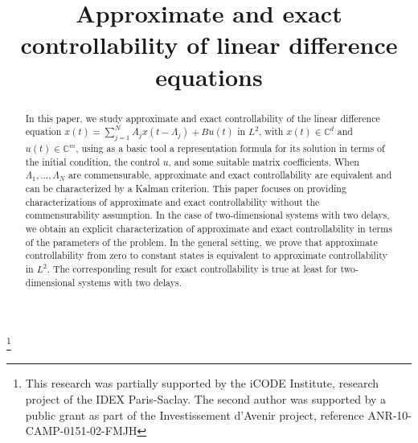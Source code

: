 \documentclass[JEP,XML,SOM,Unicode]{cedram}
\theoremstyle{plain}
\theoremstyle{definition}
\begin{document}
\frontmatter

\title{Approximate and exact controllability of linear difference equations}

\author[\initial{Y.} \lastname{Chitour}]{ }
\address{Laboratoire des Signaux et Systèmes (L2S, UMR CNRS 8506), CNRS --- CentraleSupelec --- Université Paris-Sud\\
3, rue Joliot Curie, 91192, Gif-sur-Yvette, France}

\author[\initial{G.} \lastname{Mazanti}]{ }
\address{Laboratoire de Mathématiques d'Orsay, Univ.\ Paris-Sud, CNRS, Université Paris-Saclay\\
91405 Orsay, France}

\author[\initial{M.} \lastname{Sigalotti}]{ }
\address{Inria \& Sorbonne Université, Université de Paris, CNRS, Laboratoire Jacques-Louis Lions\\
75005 Paris, France}

\thanks{This research was partially supported by the iCODE Institute, research project of the IDEX Paris-Saclay. The second author was supported by a public grant as part of the Investissement d'Avenir project, reference ANR-10-CAMP-0151-02-FMJH}

\begin{abstract}
In this paper, we study approximate and exact controllability of the linear difference equation $x(t) = \sum_{j=1}^N A_j x(t - \Lambda_j) + B u(t)$ in $L^2$, with $x(t) \in \mathbb C^d$ and $u(t) \in \mathbb C^m$, using as a basic tool a representation formula for its solution in terms of the initial condition, the control $u$, and some suitable matrix coefficients. When $\Lambda_1, \dots, \Lambda_N$ are commensurable, approximate and exact controllability are equivalent and can be characterized by a Kalman criterion. This paper focuses on providing characterizations of approximate and exact controllability without the commensurability assumption. In the case of two-dimensional systems with two delays, we obtain an explicit characterization of approximate and exact controllability in terms of the param\-eters of the problem. In the general setting, we prove that approximate controllability from zero to constant states is equivalent to approximate controllability in $L^2$. The corresponding result for exact controllability is true at least for two-dimensional systems with two delays.
\end{abstract}
\end{document}
